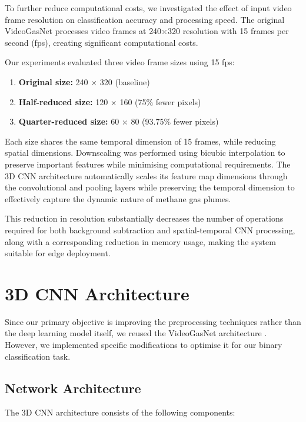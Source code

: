 To further reduce computational costs, we investigated the effect of input video frame resolution on classification accuracy and processing speed. The original VideoGasNet processes video frames at 240×320 resolution with 15 frames per second (fps), creating significant computational costs.

Our experiments evaluated three video frame sizes using 15 fps:
\begin{enumerate}
\item \textbf{Original size:} 240 × 320 (baseline)
\item \textbf{Half-reduced size:} 120 × 160 (75\% fewer pixels)
\item \textbf{Quarter-reduced size:} 60 × 80 (93.75\% fewer pixels)
\end{enumerate}

Each size shares the same temporal dimension of 15 frames, while reducing spatial dimensions. Downscaling was performed using bicubic interpolation to preserve important features while minimising computational requirements. The 3D CNN architecture automatically scales its feature map dimensions through the convolutional and pooling layers while preserving the temporal dimension to effectively capture the dynamic nature of methane gas plumes.

This reduction in resolution substantially decreases the number of operations required for both background subtraction and spatial-temporal CNN processing, along with a corresponding reduction in memory usage, making the system suitable for edge deployment.

\section{3D CNN Architecture}

Since our primary objective is improving the preprocessing techniques rather than the deep learning model itself, we reused the VideoGasNet architecture \cite{wang2022videogasnet}. However, we implemented specific modifications to optimise it for our binary classification task.

\subsection{Network Architecture}

The 3D CNN architecture consists of the following components:

